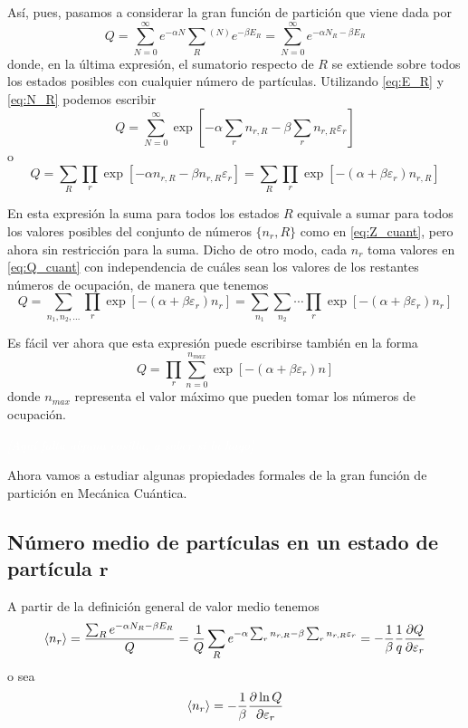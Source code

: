 Así, pues, pasamos a considerar la gran función de partición que viene dada por
\begin{equation}
	Q = \sum_{N=0}^\infty e^{-\alpha N} \sum_{R}^{} {}^{(N)} e^{-\beta E_R} = \sum_{N=0}^\infty e^{-\alpha N_R -\beta E_R}
\end{equation}
donde, en la última expresión, el sumatorio respecto de $R$ se extiende sobre todos los estados posibles con cualquier número de partículas.
Utilizando \eqref{eq:E_R} y  \eqref{eq:N_R} podemos escribir
\begin{equation}
	Q = \sum_{N=0}^\infty \exp \left[ -\alpha \sum_r n_{r,R} -\beta \sum_r n_{r,R} \varepsilon_r \right] 
\end{equation}
o
\begin{equation}\label{eq:Q_cuant}
	Q = \sum_R \prod_r \exp \left[ -\alpha n_{r,R} -\beta n_{r,R} \varepsilon_r \right]  = \sum_R \prod_r \exp \left[  -(\alpha  + \beta \varepsilon_r) n_{r,R}\right]
\end{equation}

En esta expresión la suma para todos los estados $R$ equivale a sumar para todos los valores posibles del conjunto de números $\{n_r,R\}$ como en \eqref{eq:Z_cuant}, pero ahora sin restricción para la suma.
Dicho de otro modo, cada $n_r$ toma valores en \eqref{eq:Q_cuant} con independencia de cuáles sean los valores de los restantes números de ocupación, de manera que tenemos
\begin{equation}
	Q = \sum_{n_1, n_2, \ldots} \prod_r \exp \left[  -(\alpha  + \beta \varepsilon_r) n_r\right] = \sum_{n_1} \sum_{n_2} \cdots \prod_r \exp \left[  -(\alpha  + \beta \varepsilon_r) n_{r}\right]
\end{equation}

Es fácil ver ahora que esta expresión puede escribirse también en la forma
\begin{equation}\label{eq:Q_cuant2}
	Q = \prod_r \sum_{n=0}^{n_{max}} \exp \left[  -(\alpha  + \beta \varepsilon_r) n \right]
\end{equation}
donde $n_{max}$ representa el valor máximo que pueden tomar los números de ocupación.

\colorbox{red!60}{\textcolor{white}{\textit{[Aquí falta alguna cosilla, a saber si la hago]}}}

Ahora vamos a estudiar algunas propiedades formales de la gran función de partición en Mecánica Cuántica.

\subsection*{Número medio de partículas en un estado de partícula $\bm{r}$}
A partir de la definición general de valor medio tenemos
$$\expval{n_r} = \frac{\sum_R e^{-\alpha N_R -\beta E_R}}{Q} = \frac{1}{Q} \sum_R e^{-\alpha \sum_r n_{r,R} -\beta \sum_r n_{r,R} \varepsilon_r} = - \frac{1}{\beta} \frac{1}{q} \frac{\partial Q}{\partial \varepsilon_r}$$
o sea
\begin{equation}
	\expval{n_r} = - \frac{1}{\beta} \frac{\partial \ln Q}{\partial \varepsilon_r}
\end{equation}

